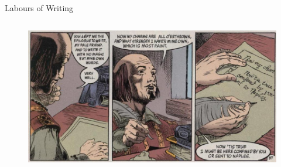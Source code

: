 \documentclass{beamer}
\begin{document}
\begin{frame}{Labours of Writing}
\begin{columns}[c]
      \begin{figure}[htp]
        \begin{center}
          \centering
          \includegraphics[scale=0.3]{epilogue.jpg}
        \end{center}
      \end{figure}
      
      \end{columns}
    \end{frame}
\end{document}
